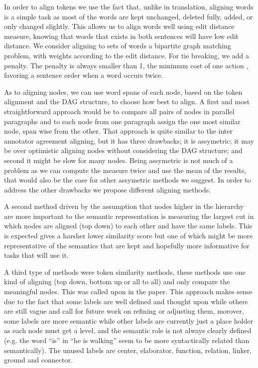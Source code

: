 \documentclass[english]{article}
\begin{document}
In order to align tokens we use the fact that, unlike in translation,
aligning words is a simple task as most of the words are kept unchanged,
deleted fully, added, or only changed slightly. This allows us to
align words well using edit distance measure, knowing that words that
exists in both sentences will have low edit distance. We consider
aligning to sets of words a bipartite graph matching problem, with
weights according to the edit distance. For tie breaking, we add a
penalty. The penalty is always smaller than 1, the minimum cost of
one action , favoring a sentence order when a word occurs twice.

As to aligning nodes, we can use word spans of each node, based on
the token alignment and the DAG structure, to choose how best to align.
A first and most straightforward approach would be to compare all
pairs of nodes in parallel paragraphs and to each node from one paragraph
assign the one most similar node, span wise from the other. That approach
is quite similar to the inter annotator agreement aligning, but it
has three drawbacks; it is assymetric; it may be over optimistic aligning
nodes without considering the DAG structure; and second it might be
slow for many nodes. Being assymetric is not much of a problem as
we can compute the measure twice and use the mean of the results,
that would also be the case for other assymetric methods we suggest.
In order to address the other drawbacks we propose different aligning
methods.

A second method driven by the assumption that nodes higher in the
hierarchy are more important to the semantic representation is measuring
the largest cut in which nodes are aligned (top down) to each other
and have the same labels. This is expected gives a harsher lower similarity
score but one of which might be more representative of the semantics
that are kept and hopefully more informative for tasks that will use
it.

A third type of methods were token similarity methods, these methods
use one kind of aligning (top down, bottom up or all to all) and only
compare the meaningful nodes. This was called upon in the \cite{sulem2015conceptual}
paper. This approach makes sense due to the fact that some labels
are well defined and thought upon while others are still vague and
call for future work on refining or adjusting them, morover, some
labels are more semantic while other labels are currently just a place
holder as each node must get a level, and the semantic role is not
always clearly defined (e.g. the word ``is'' in ``he is walking''
seem to be more syntactically related than semantically). The unused
labels are center, elaborator, function, relation, linker, ground
and connector.
\end{document}
